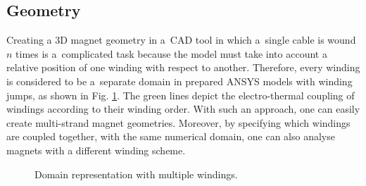 \subsection{Geometry}
\label{subsection:algorithms_geometry}

Creating a 3D magnet geometry in a~CAD tool in which a~single cable is wound $n$ times is a~complicated task because the model must take into account a relative position of one winding with respect to another. Therefore, every winding is considered to be a~separate domain in prepared ANSYS models with winding jumps, as shown in Fig. \ref{fig:winding_geom_scheme}. The green lines depict the electro-thermal coupling of windings according to their winding order. With such an approach, one can easily create multi-strand magnet geometries. Moreover, by specifying which windings are coupled together, with the same numerical domain, one can also analyse magnets with a different winding scheme.

\begin{figure}[H]
\centering
{}
\caption{Domain representation with multiple windings.}
\label{fig:winding_geom_scheme}
\end{figure}

